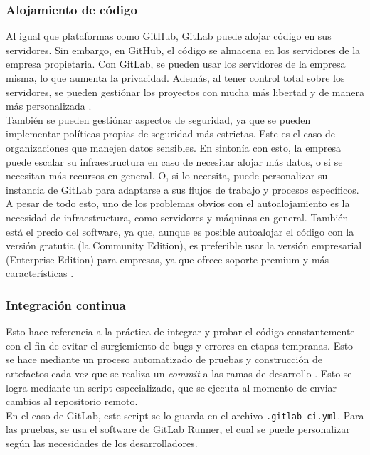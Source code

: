 \documentclass[runningheads]{llncs}
\begin{document}
\subsubsection{Alojamiento de código}
Al igual que plataformas como GitHub, GitLab puede alojar código en sus servidores. Sin embargo, en GitHub, el código se almacena
en los servidores de la empresa propietaria. Con GitLab, se pueden usar los servidores de la empresa misma, lo que aumenta la
privacidad. Además, al tener control total sobre los servidores, se pueden gestiónar los proyectos con mucha más libertad y de manera
más personalizada \cite{safari2020structural}.\\
También se pueden gestiónar aspectos de seguridad, ya que se pueden implementar políticas propias de seguridad más estrictas. Este es
el caso de organizaciones que manejen datos sensibles. En sintonía con esto, la empresa puede escalar su infraestructura en caso de
necesitar alojar más datos, o si se necesitan más recursos en general. O, si lo necesita, puede personalizar su instancia de GitLab para
adaptarse a sus flujos de trabajo y procesos específicos.\\
A pesar de todo esto, uno de los problemas obvios con el autoalojamiento es la necesidad de infraestructura, como servidores y máquinas
en general. También está el precio del software, ya que, aunque es posible autoalojar el código con la versión gratutia (la Community Edition),
es preferible usar la versión empresarial (Enterprise Edition) para empresas, ya que ofrece soporte premium y más características \cite{safari2020structural}.
\subsubsection{Integración continua}
Esto hace referencia a la práctica de integrar y probar el código constantemente con el fin de evitar el surgiemiento
de bugs y errores en etapas tempranas. Esto se hace mediante un proceso automatizado de pruebas y construcción de artefactos
cada vez que se realiza un \textit{commit} a las ramas de desarrollo \cite{alvin2023devops,uddin2023comparative}. Esto se logra
mediante un script especializado, que se ejecuta al momento de enviar cambios al repositorio remoto.\\
En el caso de GitLab, este script se lo guarda en el archivo \texttt{.gitlab-ci.yml}. Para las pruebas, se usa el software
de GitLab Runner, el cual se puede personalizar según las necesidades de los desarrolladores.
\end{document}

